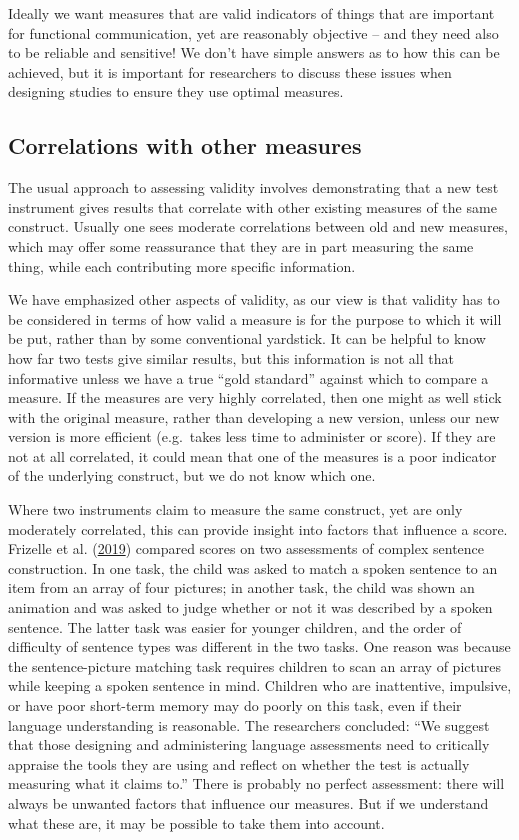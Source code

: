 \documentclass{krantz}
\begin{document}
Ideally we want measures that are valid indicators of things that are important for functional communication, yet are reasonably objective -- and they need also to be reliable and sensitive! We don't have simple answers as to how this can be achieved, but it is important for researchers to discuss these issues when designing studies to ensure they use optimal measures.

\hypertarget{correlations-with-other-measures}{%
\subsection{Correlations with other measures}\label{correlations-with-other-measures}}

The usual approach to assessing validity involves demonstrating that a new test instrument gives results that correlate with other existing measures of the same construct. Usually one sees moderate correlations between old and new measures, which may offer some reassurance that they are in part measuring the same thing, while each contributing more specific information.

We have emphasized other aspects of validity, as our view is that validity has to be considered in terms of how valid a measure is for the purpose to which it will be put, rather than by some conventional yardstick. It can be helpful to know how far two tests give similar results, but this information is not all that informative unless we have a true ``gold standard'' against which to compare a measure. If the measures are very highly correlated, then one might as well stick with the original measure, rather than developing a new version, unless our new version is more efficient (e.g.~takes less time to administer or score). If they are not at all correlated, it could mean that one of the measures is a poor indicator of the underlying construct, but we do not know which one.

Where two instruments claim to measure the same construct, yet are only moderately correlated, this can provide insight into factors that influence a score. Frizelle et al. (\protect\hyperlink{ref-frizelle2019}{2019}) compared scores on two assessments of complex sentence construction. In one task, the child was asked to match a spoken sentence to an item from an array of four pictures; in another task, the child was shown an animation and was asked to judge whether or not it was described by a spoken sentence. The latter task was easier for younger children, and the order of difficulty of sentence types was different in the two tasks. One reason was because the sentence-picture matching task requires children to scan an array of pictures while keeping a spoken sentence in mind. Children who are inattentive, impulsive, or have poor short-term memory may do poorly on this task, even if their language understanding is reasonable. The researchers concluded: ``We suggest that those designing and administering language assessments need to critically appraise the tools they are using and reflect on whether the test is actually measuring what it claims to.'' There is probably no perfect assessment: there will always be unwanted factors that influence our measures. But if we understand what these are, it may be possible to take them into account.
\end{document}
